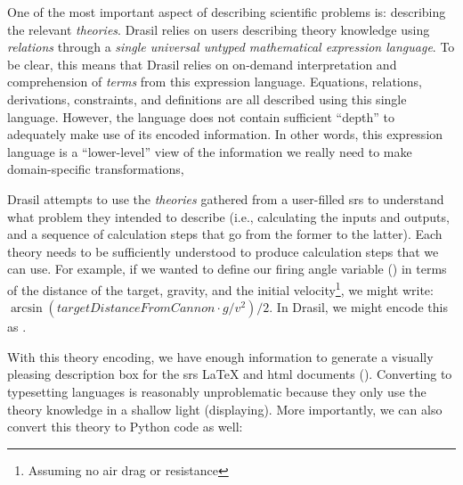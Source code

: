 One of the most important aspect of describing scientific problems is:
describing the relevant \textit{theories}. Drasil relies on users describing
theory knowledge using \textit{relations} through a \textit{single universal
untyped mathematical expression language}. To be clear, this means that Drasil
relies on on-demand interpretation and comprehension of \textit{terms} from this
expression language. Equations, relations, derivations, constraints, and
definitions are all described using this single language. However, the language
does not contain sufficient ``depth'' to adequately make use of its encoded
information. In other words, this expression language is a ``lower-level'' view
of the information we really need to make domain-specific transformations,

Drasil attempts to use the \textit{theories} gathered from a user-filled
\acs{srs} to understand what problem they intended to describe (i.e.,
calculating the inputs and outputs, and a sequence of calculation steps that go
from the former to the latter). Each theory needs to be sufficiently understood
to produce calculation steps that we can use. For example, if we wanted to
define our firing angle variable () in terms
of the distance of the target, gravity, and the initial
velocity\footnote{Assuming no air drag or resistance}, we might write:
\(\arcsin{}(\mathit{targetDistanceFromCannon} \cdot{} g / v^2) / 2\). In Drasil,
we might encode this as .

\exampleAngleEquationEncoding{}

With this theory encoding, we have enough information to generate a visually
pleasing description box for the \acs{srs} \LaTeX{} and \acs{html} documents
(). Converting to typesetting languages
is reasonably unproblematic because they only use the theory knowledge in a
shallow light (displaying). More importantly, we can also convert this theory to
Python code as well:

\exampleAngleEquationEncodingToPython{}

